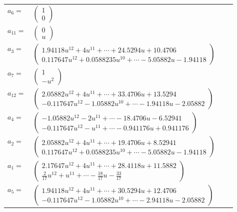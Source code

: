 \documentclass[1p]{elsarticle_modified}
\theoremstyle{definition}
\begin{document}
\begin{tabular}{m{7pt} m{180pt} m{7pt} m{180pt} }
\flushright $a_{6}=$&$\begin{pmatrix}1\\0\end{pmatrix}$ \\
\flushright $a_{11}=$&$\begin{pmatrix}0\\u\end{pmatrix}$ \\
\flushright $a_{3}=$&$\begin{pmatrix}1.94118 u^{12}+4 u^{11}+\cdots+24.5294 u+10.4706\\0.117647 u^{12}+0.0588235 u^{10}+\cdots-5.05882 u-1.94118\end{pmatrix}$ \\
\flushright $a_{7}=$&$\begin{pmatrix}1\\- u^2\end{pmatrix}$ \\
\flushright $a_{12}=$&$\begin{pmatrix}2.05882 u^{12}+4 u^{11}+\cdots+33.4706 u+13.5294\\-0.117647 u^{12}-1.05882 u^{10}+\cdots-1.94118 u-2.05882\end{pmatrix}$ \\
\flushright $a_{4}=$&$\begin{pmatrix}-1.05882 u^{12}-2 u^{11}+\cdots-18.4706 u-6.52941\\-0.117647 u^{12}-u^{11}+\cdots-0.941176 u+0.941176\end{pmatrix}$ \\
\flushright $a_{2}=$&$\begin{pmatrix}2.05882 u^{12}+4 u^{11}+\cdots+19.4706 u+8.52941\\0.117647 u^{12}+0.0588235 u^{10}+\cdots-5.05882 u-1.94118\end{pmatrix}$ \\
\flushright $a_{1}=$&$\begin{pmatrix}2.17647 u^{12}+4 u^{11}+\cdots+28.4118 u+11.5882\\\frac{2}{17} u^{12}+u^{11}+\cdots-\frac{18}{17} u-\frac{33}{17}\end{pmatrix}$ \\
\flushright $a_{5}=$&$\begin{pmatrix}1.94118 u^{12}+4 u^{11}+\cdots+30.5294 u+12.4706\\-0.117647 u^{12}-1.05882 u^{10}+\cdots-2.94118 u-2.05882\end{pmatrix}$ \\

\end{tabular}
\end{document}
